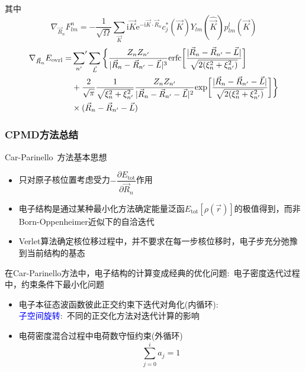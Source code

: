 {\begin{itemize}
{{\begin{itemize}
{{\begin{displaymath}
\end{displaymath}
				}}
			\end{itemize}
			其中
			\begin{displaymath}
				\nabla_{\vec R_n}F_{lm}^n=-\dfrac1{\sqrt{\Omega}}\sum_{\vec K}\mathrm{i}\vec K\mathrm{e}^{-\mathrm{i}\vec K\cdot\vec R_n}c_j^{\ast}(\vec K)Y_{lm}(\hat{\vec K})p_{lm}^l(\vec K)
			\end{displaymath}
			\begin{displaymath}
				\begin{aligned}
					\nabla_{\vec R_n}E_{\mathrm{ovrl}}=&\sideset{}{^{\prime}}\sum_{n^{\prime}}\sum_{\vec L}\bigg\{\dfrac{Z_nZ_{n^{\prime}}}{|\vec R_n-\vec R_{n^{\prime}}-\vec L|^3}\mathrm{erfc}\bigg[\dfrac{|\vec R_n-\vec R_{n^{\prime}}-\vec L|}{\sqrt{2(\xi_n^2+\xi_{n^{\prime}}^2)}}\bigg]\\
					&+\dfrac2{\sqrt{\pi}}\dfrac1{\sqrt{\xi_n^2+\xi_{n^{\prime}}^2}}\dfrac{Z_nZ_{n^{\prime}}}{|\vec R_n-\vec R_{n^{\prime}}-\vec L|^2}\mathrm{exp}\bigg[\dfrac{|\vec R_n-\vec R_{n^{\prime}}-\vec L|}{\sqrt{2(\xi_n^2+\xi_{n^{\prime}}^2)}}\bigg]\bigg\}\\
					&\times(\vec R_n-\vec R_{n^{\prime}}-\vec L)
				\end{aligned}
			\end{displaymath}
		}}
	\end{itemize}

}

\frame
{
	\frametitle{\textrm{CPMD}方法总结}
	\textrm{Car-Parinello~}方法基本思想
	\begin{itemize}
		\item 只对原子核位置考虑受力$-\dfrac{\partial E_{\mathrm{tot}}}{\partial\vec R_n}$作用
		\item 电子结构是通过某种最小化方法确定能量泛函$E_{\mathrm{tot}}[\rho(\vec r)]$的极值得到，而非\textrm{Born-Oppenheimer}近似下的自洽迭代
		\item \textrm{Verlet}算法确定核位移过程中，并不要求在每一步核位移时，电子步充分弛豫到当前结构的基态
	\end{itemize}
	在\textrm{Car-Parinello}方法中，电子结构的计算变成经典的优化问题:~电子密度迭代过程中，约束条件下最小化问题
	\begin{itemize}
		\item 电子本征态波函数彼此正交约束下迭代对角化(内循环):\\
			\textcolor{blue}{子空间旋转}:~不同的正交化方法对迭代计算的影响
		\item 电荷密度混合过程中电荷数守恒约束(外循环)
			\begin{displaymath}
				\sum\limits_{j=0}^i a_j=1
			\end{displaymath}
	\end{itemize}
}


